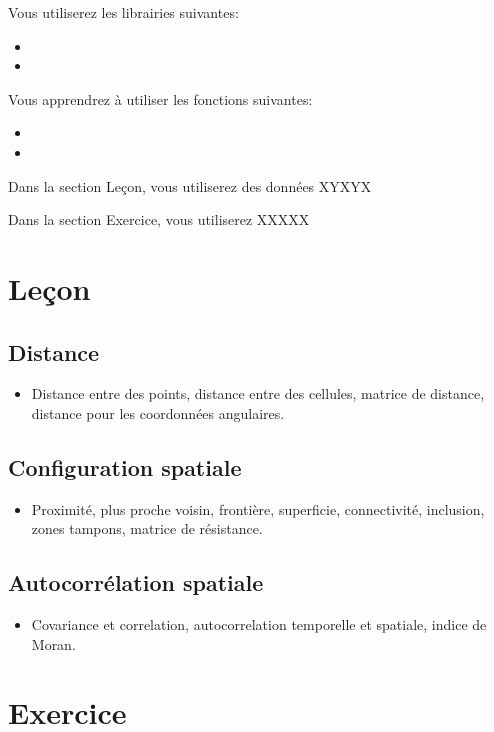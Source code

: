 \documentclass[
  12pt,
]{krantz}
\providecommand{\tightlist}{%
  \setlength{\itemsep}{0pt}\setlength{\parskip}{0pt}}
\begin{document}
Vous utiliserez les librairies suivantes:

\begin{itemize}
\item
\item
\end{itemize}

Vous apprendrez à utiliser les fonctions suivantes:

\begin{itemize}
\item
\item
\end{itemize}

Dans la section Leçon, vous utiliserez des données XYXYX

Dans la section Exercice, vous utiliserez XXXXX

\hypertarget{leuxe7on-8}{%
\section{Leçon}\label{leuxe7on-8}}

\hypertarget{distance}{%
\subsection{Distance}\label{distance}}

\begin{itemize}
\tightlist
\item
  Distance entre des points, distance entre des cellules, matrice de distance, distance pour les coordonnées angulaires.
\end{itemize}

\hypertarget{configuration-spatiale}{%
\subsection{Configuration spatiale}\label{configuration-spatiale}}

\begin{itemize}
\tightlist
\item
  Proximité, plus proche voisin, frontière, superficie, connectivité, inclusion, zones tampons, matrice de résistance.
\end{itemize}

\hypertarget{autocorruxe9lation-spatiale}{%
\subsection{Autocorrélation spatiale}\label{autocorruxe9lation-spatiale}}

\begin{itemize}
\tightlist
\item
  Covariance et correlation, autocorrelation temporelle et spatiale, indice de Moran.
\end{itemize}

\hypertarget{exercice-8}{%
\section{Exercice}\label{exercice-8}}

  

\printindex
\end{document}
